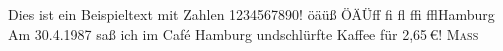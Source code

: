 \documentclass[ngerman,a4paper,10pt]{article}
\def\BSP{%
Dies ist ein Beispieltext mit Zahlen 1234567890!\newline%
öäüß ÖÄÜ\quad ff fi fl ffi ffl\quad Hamburg\newline%
Am 30.4.1987 saß ich im \glqq{}Caf\'e Hamburg\grqq{} und\newline schlürfte Kaffee für 2,65\,€!\newline
\textsc{Maß}}
\begin{document}
\BSP
\end{document}
